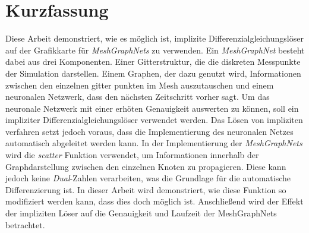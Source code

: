 \chapter*{Kurzfassung}

Diese Arbeit demonstriert, wie es möglich ist, implizite Differenzialgleichungslöser 
auf der Grafikkarte für \textit{MeshGraphNets} zu verwenden.
Ein \textit{MeshGraphNet} besteht dabei aus drei Komponenten.
Einer Gitterstruktur, die die diskreten Messpunkte der Simulation darstellen.
Einem Graphen, der dazu genutzt wird, Informationen zwischen den einzelnen gitter punkten im Mesh auszutauschen
und einem neuronalen Netzwerk, dass den nächsten Zeitschritt vorher sagt.
Um das neuronale Netzwerk mit einer erhöten Genauigkeit auswerten zu können, soll ein impliziter Differenzialgleichungslöser verwendet werden.
Das Lösen von impliziten verfahren setzt jedoch voraus, dass die Implementierung des neuronalen
Netzes automatisch abgeleitet werden kann.
In der Implementierung der \textit{MeshGraphNets} wird die \textit{scatter} Funktion verwendet, um Informationen
innerhalb der Graphdarstellung zwischen den einzelnen Knoten zu propagieren.
Diese kann jedoch keine \textit{Dual}-Zahlen verarbeiten, was die Grundlage für die automatische Differenzierung ist.
In dieser Arbeit wird demonstriert, wie diese Funktion so modifiziert werden kann, dass dies doch möglich ist.
Anschließend wird der Effekt der impliziten Löser auf die Genauigkeit und Laufzeit der MeshGraphNets betrachtet.

\cleardoublepage